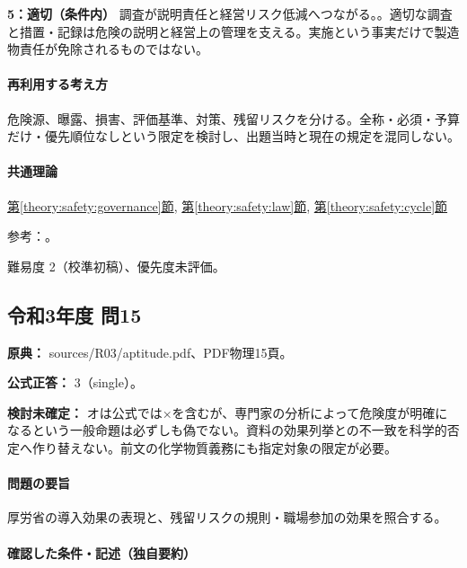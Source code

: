 \noindent\textbf{5：適切（条件内）} 調査が説明責任と経営リスク低減へつながる。。適切な調査と措置・記録は危険の説明と経営上の管理を支える。実施という事実だけで製造物責任が免除されるものではない。\par

\paragraph{再利用する考え方} 危険源、曝露、損害、評価基準、対策、残留リスクを分ける。全称・必須・予算だけ・優先順位なしという限定を検討し、出題当時と現在の規定を混同しない。

\paragraph{共通理論} \hyperref[theory:safety:governance]{第\ref*{theory:safety:governance}節}, \hyperref[theory:safety:law]{第\ref*{theory:safety:law}節}, \hyperref[theory:safety:cycle]{第\ref*{theory:safety:cycle}節}

\par 参考：\cite{saf_ra2006,saf_ra_effects}。

\par 難易度 2（校準初稿）、優先度未評価。

\subsection{令和3年度 問15}
\label{q:r03-reg-apt-15}

\noindent\textbf{原典：} sources/R03/aptitude.pdf、PDF物理15頁。

\textbf{公式正答：} 3（single）。

\par\textbf{検討未確定：} オは公式では×を含むが、専門家の分析によって危険度が明確になるという一般命題は必ずしも偽でない。資料の効果列挙との不一致を科学的否定へ作り替えない。前文の化学物質義務にも指定対象の限定が必要。

\paragraph{問題の要旨} 厚労省の導入効果の表現と、残留リスクの規則・職場参加の効果を照合する。

\paragraph{確認した条件・記述（独自要約）}\mbox{}\par

